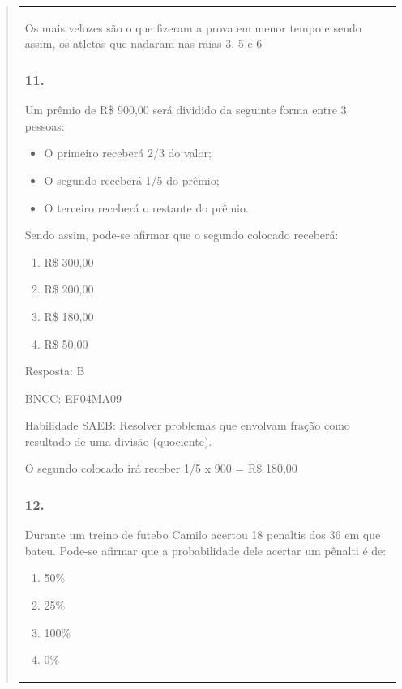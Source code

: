\begin{enumerate}
\begin{escolha}
\begin{enumerate}
\begin{itemize}
\begin{itemize}
\begin{escolha}
\begin{quote}
\begin{escolha}
{\begin{longtable}[]{@{}l@{}}
\begin{itemize}
Os mais velozes são o que fizeram a prova em menor tempo e sendo assim,
os atletas que nadaram nas raias 3, 5 e 6

\subsubsection{11.}\label{section-182}

Um prêmio de R\$ 900,00 será dividido da seguinte forma entre 3 pessoas:

\begin{itemize}
\item
  O primeiro receberá 2/3 do valor;
\item
  O segundo receberá 1/5 do prêmio;
\item
  O terceiro receberá o restante do prêmio.
\end{itemize}

Sendo assim, pode-se afirmar que o segundo colocado receberá:

\begin{enumerate}
\def\labelenumi{\alph{enumi})}
\item
  R\$ 300,00
\item
  R\$ 200,00
\item
  R\$ 180,00
\item
  R\$ 50,00
\end{enumerate}

Resposta: B

BNCC: EF04MA09

Habilidade SAEB: Resolver problemas que envolvam fração como resultado
de uma divisão (quociente).

O segundo colocado irá receber 1/5 x 900 = R\$ 180,00

\subsubsection{12.}\label{section-183}

Durante um treino de futebo Camilo acertou 18 penaltis dos 36 em que
bateu. Pode-se afirmar que a probabilidade dele acertar um pênalti é de:

\begin{enumerate}
\def\labelenumi{\alph{enumi})}
\item
  50\%
\item
  25\%
\item
  100\%
\item
  0\%
\end{enumerate}


\end{itemize}
\end{longtable}}
\end{escolha}
\end{quote}
\end{escolha}
\end{itemize}
\end{itemize}
\end{enumerate}
\end{escolha}
\end{enumerate}
